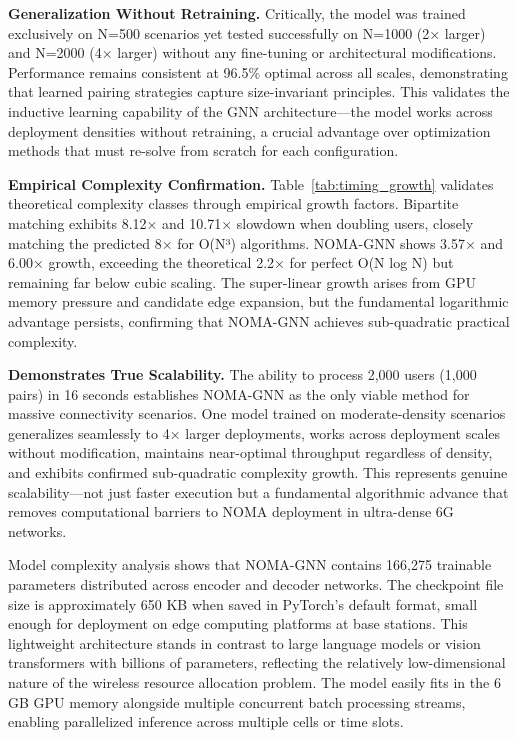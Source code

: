 \textbf{Generalization Without Retraining.} Critically, the model was trained exclusively on N=500 scenarios yet tested successfully on N=1000 (2× larger) and N=2000 (4× larger) without any fine-tuning or architectural modifications. Performance remains consistent at 96.5\% optimal across all scales, demonstrating that learned pairing strategies capture size-invariant principles. This validates the inductive learning capability of the GNN architecture—the model works across deployment densities without retraining, a crucial advantage over optimization methods that must re-solve from scratch for each configuration.

\textbf{Empirical Complexity Confirmation.} Table~\ref{tab:timing_growth} validates theoretical complexity classes through empirical growth factors. Bipartite matching exhibits 8.12× and 10.71× slowdown when doubling users, closely matching the predicted 8× for O(N³) algorithms. NOMA-GNN shows 3.57× and 6.00× growth, exceeding the theoretical 2.2× for perfect O(N log N) but remaining far below cubic scaling. The super-linear growth arises from GPU memory pressure and candidate edge expansion, but the fundamental logarithmic advantage persists, confirming that NOMA-GNN achieves sub-quadratic practical complexity.

\textbf{Demonstrates True Scalability.} The ability to process 2,000 users (1,000 pairs) in 16 seconds establishes NOMA-GNN as the only viable method for massive connectivity scenarios. One model trained on moderate-density scenarios generalizes seamlessly to 4× larger deployments, works across deployment scales without modification, maintains near-optimal throughput regardless of density, and exhibits confirmed sub-quadratic complexity growth. This represents genuine scalability—not just faster execution but a fundamental algorithmic advance that removes computational barriers to NOMA deployment in ultra-dense 6G networks.

Model complexity analysis shows that NOMA-GNN contains 166,275 trainable parameters distributed across encoder and decoder networks. The checkpoint file size is approximately 650 KB when saved in PyTorch's default format, small enough for deployment on edge computing platforms at base stations. This lightweight architecture stands in contrast to large language models or vision transformers with billions of parameters, reflecting the relatively low-dimensional nature of the wireless resource allocation problem. The model easily fits in the 6 GB GPU memory alongside multiple concurrent batch processing streams, enabling parallelized inference across multiple cells or time slots.

